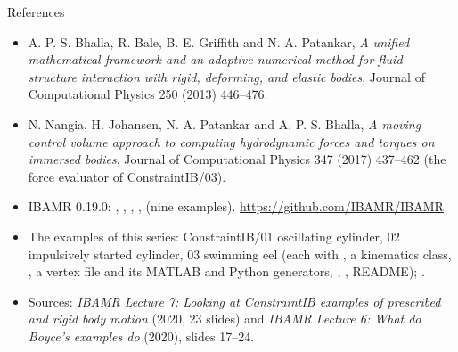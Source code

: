 \documentclass[aspectratio=169,11pt]{beamer}
\begin{document}
\begin{frame}{References}
\label{fr:refs}
\scriptsize
\begin{itemize}
  \item A. P. S. Bhalla, R. Bale, B. E. Griffith and N. A. Patankar, \emph{A unified mathematical framework and an adaptive numerical method for fluid--structure interaction with rigid, deforming, and elastic bodies}, Journal of Computational Physics 250 (2013) 446--476.
  \item N. Nangia, H. Johansen, N. A. Patankar and A. P. S. Bhalla, \emph{A moving control volume approach to computing hydrodynamic forces and torques on immersed bodies}, Journal of Computational Physics 347 (2017) 437--462 (the force evaluator of ConstraintIB/03).
  \item IBAMR 0.19.0: , , , ,  (nine examples). \url{https://github.com/IBAMR/IBAMR}
  \item The examples of this series: ConstraintIB/01 oscillating cylinder, 02 impulsively started cylinder, 03 swimming eel (each with , a kinematics class, , a vertex file and its MATLAB and Python generators, , , README); .
  \item Sources: \emph{IBAMR Lecture 7: Looking at ConstraintIB examples of prescribed and rigid body motion} (2020, 23 slides) and \emph{IBAMR Lecture 6: What do Boyce's examples do} (2020), slides 17--24.
\end{itemize}
\end{frame}
\end{document}
